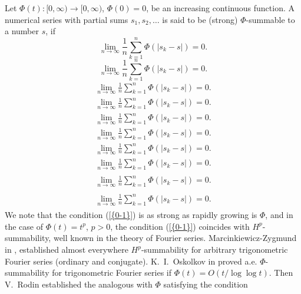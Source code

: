 \documentclass{amsart}
\numberwithin{equation}{section}
\begin{document}
Let $\Phi(t):[0,\infty)\to[0,\infty)$, $\Phi(0)=0$, be an increasing continuous function. A numerical series with partial sums $s_1,s_2,\ldots $ is said to be (strong) $\Phi$-summable to a number $s$, if
{
\begin{equation*} \label{0-1}
\lim_{n\to\infty}\frac{1}{n}\sum_{k=1}^n\Phi\left(|s_k-s|\right)=0.
 \end{equation*}\fi  
{}\begin{equation}\label{0-1}
\lim_{n\to\infty}\frac{1}{n}\sum_{k=1}^n\Phi\left(|s_k-s|\right)=0.
\end{equation}\fi   
{}\begin{align*}\label{0-1}
\lim_{n\to\infty}\frac{1}{n}\sum_{k=1}^n\Phi\left(|s_k-s|\right)=0.
\end{align*}\fi   
{}\begin{align}\label{0-1}
\lim_{n\to\infty}\frac{1}{n}\sum_{k=1}^n\Phi\left(|s_k-s|\right)=0.
\end{align}\fi    
{}\begin{gather*}\label{0-1}
\lim_{n\to\infty}\frac{1}{n}\sum_{k=1}^n\Phi\left(|s_k-s|\right)=0.
\end{gather*}\fi  
{}\begin{gather}\label{0-1}
\lim_{n\to\infty}\frac{1}{n}\sum_{k=1}^n\Phi\left(|s_k-s|\right)=0.
\end{gather}\fi   
{}\begin{multline*}\label{0-1}
\lim_{n\to\infty}\frac{1}{n}\sum_{k=1}^n\Phi\left(|s_k-s|\right)=0.
\end{multline*}\fi  
{}\begin{multline}\label{0-1}
\lim_{n\to\infty}\frac{1}{n}\sum_{k=1}^n\Phi\left(|s_k-s|\right)=0.
\end{multline}\fi  
{}\begin{multline*}\begin{split}\label{0-1}
\lim_{n\to\infty}\frac{1}{n}\sum_{k=1}^n\Phi\left(|s_k-s|\right)=0.
\end{split}\end{multline*}\fi
{}\begin{multline}\begin{split}\label{0-1}
\lim_{n\to\infty}\frac{1}{n}\sum_{k=1}^n\Phi\left(|s_k-s|\right)=0.
\end{split}\end{multline}\fi
}
We note that the condition {(\ref{{0-1}})} is as strong as rapidly growing is $\Phi$, and in the case of $\Phi(t)=t^p$, $p>0$, the condition {(\ref{{0-1}})} coincides with $H^p$-summability, well known in the theory of Fourier series. Marcinkiewicz-Zygmund in \cite{Mar}, \cite{Zyg} established almost everywhere $H^p$-summability for arbitrary trigonometric Fourier series (ordinary and conjugate). K.~I.~Oskolkov in \cite{Osk} proved a.e. $\Phi$-summability for trigonometric Fourier series if $\Phi(t)=O(t/\log\log t)$. Then V.~Rodin \cite{Rod1} established the analogous with $\Phi$ satisfying the condition
\end{document}
